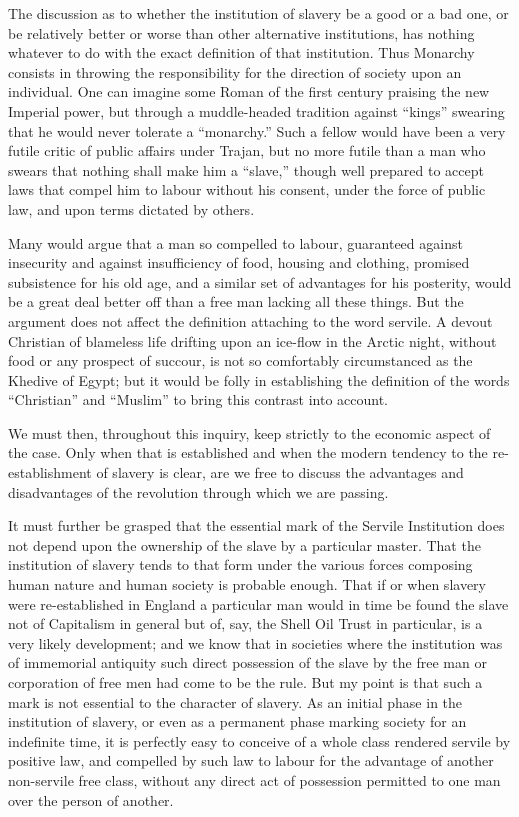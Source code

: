 \documentclass{book}
\begin{document}
The discussion as to whether the institution of slavery be a good or a bad one, or be relatively better or worse than other alternative institutions, has nothing whatever to do with the exact definition of that institution. Thus Monarchy consists in throwing the responsibility for the direction of society upon an individual. One can imagine some Roman of the first century praising the new Imperial power, but through a muddle-headed tradition against “kings” swearing that he would never tolerate a “monarchy.” Such a fellow would have been a very futile critic of public affairs under Trajan, but no more futile than a man who swears that nothing shall make him a “slave,” though well prepared to accept laws that compel him to labour without his consent, under the force of public law, and upon terms dictated by others.

Many would argue that a man so compelled to labour, guaranteed against insecurity and against insufficiency of food, housing and clothing, promised subsistence for his old age, and a similar set of advantages for his posterity, would be a great deal better off than a free man lacking all these things. But the argument does not affect the definition attaching to the word servile. A devout Christian of blameless life drifting upon an ice-flow in the Arctic night, without food or any prospect of succour, is not so comfortably circumstanced as the Khedive of Egypt; but it would be folly in establishing the definition of the words “Christian” and “Muslim” to bring this contrast into account.

We must then, throughout this inquiry, keep strictly to the economic aspect of the case. Only when that is established and when the modern tendency to the re-establishment of slavery is clear, are we free to discuss the advantages and disadvantages of the revolution through which we are passing.

It must further be grasped that the essential mark of the Servile Institution does not depend upon the ownership of the slave by a particular master. That the institution of slavery tends to that form under the various forces composing human nature and human society is probable enough. That if or when slavery were re-established in England a particular man would in time be found the slave not of Capitalism in general but of, say, the Shell Oil Trust in particular, is a very likely development; and we know that in societies where the institution was of immemorial antiquity such direct possession of the slave by the free man or corporation of free men had come to be the rule. But my point is that such a mark is not essential to the character of slavery. As an initial phase in the institution of slavery, or even as a permanent phase marking society for an indefinite time, it is perfectly easy to conceive of a whole class rendered servile by positive law, and compelled by such law to labour for the advantage of another non-servile free class, without any direct act of possession permitted to one man over the person of another.
\end{document}
